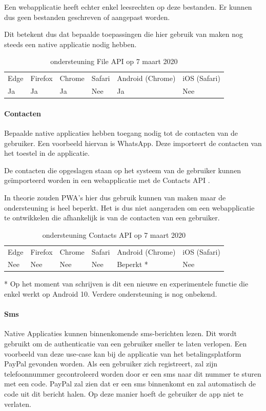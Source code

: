 	Een webapplicatie heeft echter enkel leesrechten op deze bestanden. Er kunnen dus geen bestanden geschreven of aangepast worden.
	
	Dit betekent dus dat bepaalde toepassingen die hier gebruik van maken nog steeds een native applicatie nodig hebben.
	
	\begin{table}[H]
		\centering
		\begin{tabular}{llllll}
			Edge & Firefox & Chrome & Safari & Android (Chrome) & iOS (Safari) \\
			Ja   & Ja      &  Ja     & Nee     & Ja               & Nee          
		\end{tabular}	
		\caption{ondersteuning File API op 7 maart 2020}
	\end{table}	
	
	
	\paragraph{Contacten}
	Bepaalde native applicaties hebben toegang nodig tot de contacten van de gebruiker. Een voorbeeld hiervan is WhatsApp. Deze importeert de contacten van het toestel in de applicatie.
	
	De contacten die opgeslagen staan op het systeem van de gebruiker kunnen geïmporteerd worden in een webapplicatie met de Contacts API \autocite{Tibbett2014}.
	
	In theorie zouden PWA's hier dus gebruik kunnen van maken maar de ondersteuning is heel beperkt. Het is dus niet aangeraden om een webapplicatie te ontwikkelen die afhankelijk is van de contacten van een gebruiker.
	
	\begin{table}[H]
		\centering
		\begin{tabular}{llllll}
			Edge & Firefox & Chrome & Safari & Android (Chrome) & iOS (Safari) \\
			Nee   & Nee      &  Nee     & Nee     & Beperkt *               & Nee          
		\end{tabular}	
		\caption{ondersteuning Contacts API op 7 maart 2020}{ * Op het moment van schrijven is dit een nieuwe en experimentele functie die enkel werkt op 
		Android 10. Verdere ondersteuning is nog onbekend.}
	\end{table}	
	
	
	\paragraph{Sms}
	Native Applicaties kunnen binnenkomende sms-berichten lezen. Dit wordt gebruikt om de authenticatie van een gebruiker sneller te laten verlopen. Een voorbeeld van deze use-case kan bij de applicatie van het betalingsplatform PayPal gevonden worden. Als een gebruiker zich registreert, zal zijn telefoonnummer gecontroleerd worden door er een sms naar dit nummer te sturen met een code. PayPal zal zien dat er een sms binnenkomt en zal automatisch de code uit dit bericht halen. Op deze manier hoeft de gebruiker de app niet te verlaten.
	
